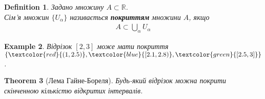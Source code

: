 \documentclass[a4paper, 14pt]{article}
\theoremstyle{theoremdd}
\newtheorem{theorem}{Theorem}[subsection]
\theoremstyle{theoremdd}
\newtheorem{definition}[theorem]{Definition}
\theoremstyle{theoremdd}
\theoremstyle{theoremdd}
\newtheorem{example}[theorem]{Example}
\theoremstyle{theoremdd}
\theoremstyle{theoremdd}
\theoremstyle{theoremdd}
\theoremstyle{theoremdd}
\begin{document}
	\begin{definition}
	Задано множину $A \subset \mathbb{R}$.\\
	Сім'я множин $\{U_{\alpha}\}$ називається \textbf{покриттям} множини $A$, якщо
	\begin{align*}
	A \subset \bigcup_{\alpha} U_{\alpha}
	\end{align*}
	\end{definition}
	
	\begin{example}
	Відрізок $[2,3]$ може мати покриття $\{\textcolor{red}{(1,2.5)}, \textcolor{blue}{[2.1,2.8)}, \textcolor{green}{[2.5,3]}\}$.
	\begin{figure}[H]
	\centering
	\end{figure}
	\end{example}
	
	\begin{theorem}[Лема Гайне-Бореля]
	Будь-який відрізок можна покрити скінченною кількістю відкритих інтервалів.
	\end{theorem}
	
\end{document}
